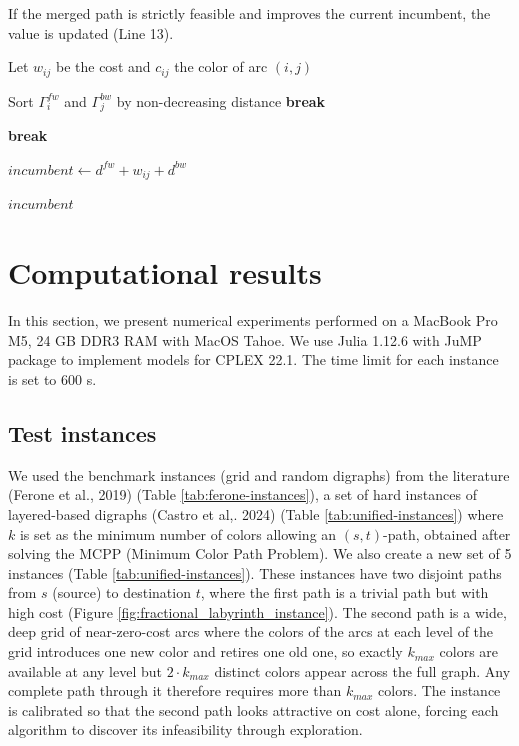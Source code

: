 \documentclass[pdflatex,sn-mathphys-num]{sn-jnl}
\begin{document}
If the merged path is strictly feasible and improves the current incumbent, the value is updated (Line 13).
\begin{algorithm}
\caption{Join}
\label{alg:join}
\begin{algorithmic}[1]
    \STATE Let $w_{ij}$ be the cost and $c_{ij}$ the color of arc $(i,j)$

    
    \STATE Sort $\Gamma_i^{fw}$ and $\Gamma_j^{bw}$ by non-decreasing distance    
            \STATE \textbf{break} 
        \ENDIF
        
                \STATE \textbf{break} 
            \ENDIF
            
                \STATE $incumbent \leftarrow d^{fw} + w_{ij} + d^{bw}$
            \ENDIF
        \ENDFOR
    \ENDFOR
\ENDFOR

\RETURN $incumbent$
\end{algorithmic}
\end{algorithm}

\section{Computational results}
In this section, we present numerical experiments performed on a
MacBook Pro M5, 24 GB DDR3 RAM with MacOS Tahoe. We use Julia 1.12.6 with JuMP package to implement
models for CPLEX 22.1. The time limit for each instance is set to 600 s.

\subsection{Test instances}
We used the benchmark instances (grid and random digraphs) from
the literature (Ferone et al., 2019) (Table \ref{tab:ferone-instances}), a set of hard instances of layered-based digraphs
(Castro et al,. 2024) (Table \ref{tab:unified-instances}) where $k$ is set as the minimum number of colors allowing 
an $(s,t)$-path, obtained after solving the MCPP (Minimum Color Path Problem).
We also create a new set of 5 instances (Table \ref{tab:unified-instances}). These instances have two disjoint paths from $s$ (source) 
to destination $t$, where the first path is a trivial path but with high cost (Figure \ref{fig:fractional_labyrinth_instance}).
The second path is a wide, deep grid of near-zero-cost arcs where the colors of the arcs 
at each level of the grid introduces one new color and retires one old one, so exactly $k_{max}$ colors 
are available at any level but $2\cdot k_{max}$ distinct colors appear across the full graph.
Any complete path through it therefore requires more than $k_{max}$ colors.
The instance is calibrated so that the second path looks attractive on cost alone, 
forcing each algorithm to discover its infeasibility through exploration. 
\end{document}
